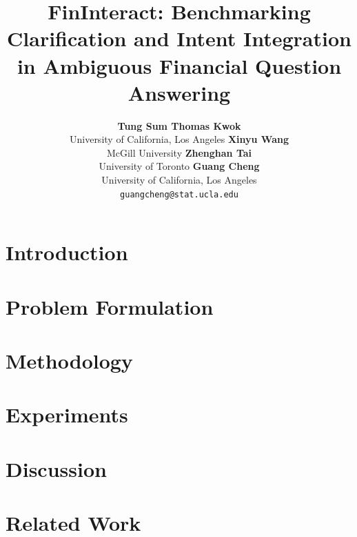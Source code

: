 \documentclass[11pt]{article}
\title{FinInteract: Benchmarking Clarification and Intent Integration in Ambiguous Financial Question Answering}
\author{
  \textbf{Tung Sum Thomas Kwok} \\
  University of California, Los Angeles
  \And
  \textbf{Xinyu Wang} \\
  McGill University
  \And
  \textbf{Zhenghan Tai} \\
  University of Toronto
  \AND
  \textbf{Guang Cheng} \\
  University of California, Los Angeles \\
  \texttt{guangcheng@stat.ucla.edu}
}
\begin{document}
\maketitle

\begin{abstract}

\end{abstract}

\section{Introduction}
\label{sec:intro}


\section{Problem Formulation}
\label{sec:task}


\section{Methodology}
\label{sec:methodology}


\section{Experiments}
\label{sec:exp}
\label{sec:eval}


\section{Discussion}
\label{sec:discussion}


\section{Related Work}
\label{sec:related}

\end{document}
